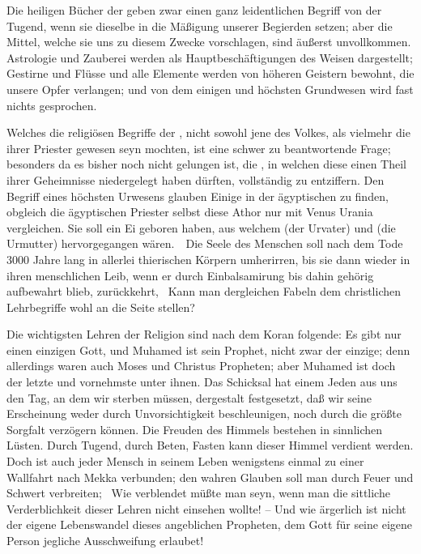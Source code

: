 \begin{aufza}
\item Die heiligen Bücher der  geben zwar einen ganz leidentlichen Begriff von der Tugend, wenn sie dieselbe in die Mäßigung unserer Begierden setzen; aber die Mittel, welche sie uns zu diesem Zwecke vorschlagen, sind äußerst unvollkommen. Astrologie und Zauberei werden als Hauptbeschäftigungen des Weisen dargestellt; Gestirne und Flüsse und alle Elemente werden von höheren Geistern bewohnt, die unsere Opfer verlangen; und von dem einigen und höchsten Grundwesen wird fast nichts gesprochen.
\item Welches die religiösen Begriffe der , nicht sowohl jene des Volkes, als vielmehr die ihrer Priester gewesen seyn mochten, ist eine schwer zu beantwortende Frage; besonders da es bisher noch nicht gelungen ist, die , in welchen diese einen Theil ihrer Geheimnisse niedergelegt haben dürften, vollständig zu entziffern. Den Begriff eines höchsten Urwesens glauben Einige in der ägyptischen  zu finden, obgleich die ägyptischen Priester selbst diese Athor nur mit Venus Urania vergleichen. Sie soll ein Ei geboren haben, aus welchem  (der Urvater) und  (die Urmutter) hervorgegangen wären.~\ Die Seele des Menschen soll nach dem Tode 3000 Jahre lang in allerlei thierischen Körpern umherirren, bis sie dann wieder in ihren menschlichen Leib, wenn er durch Einbalsamirung bis dahin gehörig aufbewahrt blieb, zurückkehrt, \usw\ Kann man dergleichen Fabeln dem christlichen Lehrbegriffe wohl an die Seite stellen?
\item Die wichtigsten Lehren der  Religion sind nach dem Koran folgende: Es gibt nur einen einzigen Gott, und Muhamed ist sein Prophet, nicht zwar der einzige; denn allerdings waren auch Moses und Christus Propheten; aber Muhamed ist doch der letzte und vornehmste unter ihnen. Das Schicksal hat einem Jeden aus uns den Tag, an dem wir sterben müssen, dergestalt festgesetzt, daß wir seine Erscheinung weder durch Unvorsichtigkeit beschleunigen, noch durch die größte Sorgfalt verzögern können. Die Freuden des Himmels bestehen in sinnlichen Lüsten. Durch Tugend, durch Beten, Fasten kann dieser Himmel verdient werden. Doch ist auch jeder Mensch in seinem Leben wenigstens einmal zu einer Wallfahrt nach Mekka verbunden; den wahren Glauben soll man durch Feuer und Schwert verbreiten; \usw\ Wie verblendet müßte man seyn, wenn man die sittliche Verderblichkeit dieser Lehren nicht einsehen wollte! -- Und wie ärgerlich ist nicht der eigene Lebenswandel dieses angeblichen Propheten, dem Gott für seine eigene Person jegliche Ausschweifung erlaubet!

\end{aufza}
